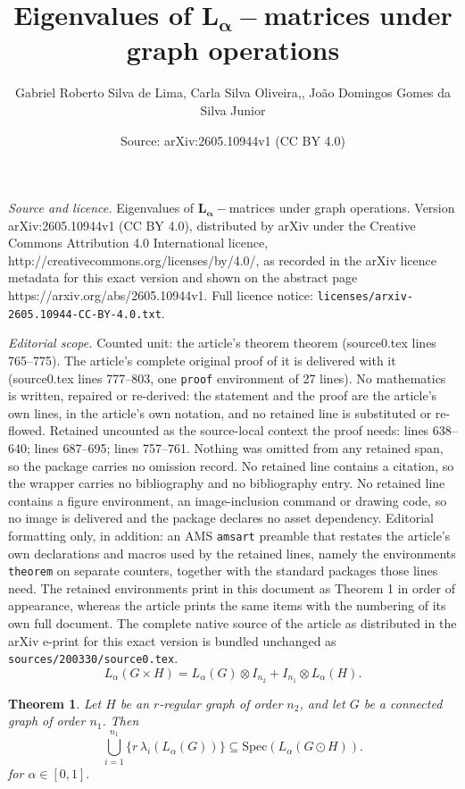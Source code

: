 \documentclass[10pt,a4paper]{amsart}
\title{Eigenvalues of $\boldsymbol{L_\alpha}-$matrices under graph operations}
\author{Gabriel Roberto Silva de Lima, Carla Silva Oliveira,, Jo\~ao Domingos Gomes da Silva Junior}
\date{Source: arXiv:2605.10944v1 (CC BY 4.0)}
\newtheorem{theorem}{Theorem}
\begin{document}
\maketitle

\noindent\emph{Source and licence.} Eigenvalues of $\boldsymbol{L_\alpha}-$matrices under graph operations. Version arXiv:2605.10944v1 (CC BY 4.0), distributed by arXiv under the Creative Commons Attribution 4.0 International licence, http://creativecommons.org/licenses/by/4.0/, as recorded in the arXiv licence metadata for this exact version and shown on the abstract page https://arxiv.org/abs/2605.10944v1. Full licence notice: \texttt{licenses/arxiv-2605.10944-CC-BY-4.0.txt}.\par\smallskip

\noindent\textit{Editorial scope.} Counted unit: the article's theorem theorem (source0.tex lines 765--775). The article's complete original proof of it is delivered with it (source0.tex lines 777--803, one \texttt{proof} environment of 27 lines). No mathematics is written, repaired or re-derived: the statement and the proof are the article's own lines, in the article's own notation, and no retained line is substituted or re-flowed.  Retained uncounted as the source-local context the proof needs: lines 638--640; lines 687--695; lines 757--761.  Nothing was omitted from any retained span, so the package carries no omission record.  No retained line contains a citation, so the wrapper carries no bibliography and no bibliography entry.  No retained line contains a figure environment, an image-inclusion command or drawing code, so no image is delivered and the package declares no asset dependency.  Editorial formatting only, in addition: an AMS \texttt{amsart} preamble that restates the article's own declarations and macros used by the retained lines, namely the environments \texttt{theorem} on separate counters, together with the standard packages those lines need.  The retained environments print in this document as Theorem 1 in order of appearance, whereas the article prints the same items with the numbering of its own full document.  The complete native source of the article as distributed in the arXiv e-print for this exact version is bundled unchanged as \texttt{sources/200330/source0.tex}.
\begin{equation}\label{eq:cartesian}
L_\alpha(G \times H) = L_\alpha(G) \otimes I_{n_2} + I_{n_1} \otimes L_\alpha(H).
\end{equation}

\begin{theorem}\label{teorema35}
Let $H$ be an $r$-regular graph of order $n_2$, and let $G$ be a connected graph of order $n_1$. Then
\[
\bigcup_{i=1}^{n_1} \{ r\,\lambda_i(L_\alpha(G)) \}
\subseteq
\mathrm{Spec}(L_\alpha(G \odot H)).
\]
for $\alpha \in [0,1].$
\end{theorem}
\end{document}
